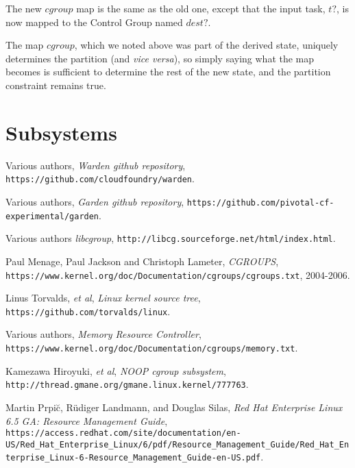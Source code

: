 \documentclass[a4paper,twoside,12pt]{article}
\begin{document}
The new $cgroup$ map is the same as the old one, except that the input task, $t?$, is now mapped to the Control Group named $dest?$.

The map $cgroup$, which we noted above was part of the derived state, uniquely determines the partition (and \emph{vice versa}), so simply saying what the map becomes is sufficient to determine the rest of the new state, and the partition constraint remains true.

\section{Subsystems}

\clearpage
\begin{flushleft}
\begin{thebibliography}{99}   %


  Various authors,
  \emph{Warden github repository},
  \texttt{https://github.com/cloudfoundry/warden}.

  Various authors,
  \emph{Garden github repository}, 
  \texttt{https://github.com/pivotal-cf-experimental/garden}.

  Various authors
  \emph{libcgroup},
  \texttt{http://libcg.sourceforge.net/html/index.html}.

  Paul Menage, Paul Jackson and Christoph Lameter,
  \emph{CGROUPS},
  \texttt{https://www.kernel.org/doc/Documentation/cgroups/cgroups.txt}, 2004-2006.

  Linus Torvalds, \emph{et al},
  \emph{Linux kernel source tree},
  \texttt{https://github.com/torvalds/linux}.

  Various authors,
  \emph{Memory Resource Controller},
  \texttt{https://www.kernel.org/doc/Documentation/cgroups/memory.txt}.

  Kamezawa Hiroyuki, \emph{et al},
  \emph{NOOP cgroup subsystem},
  \texttt{http://thread.gmane.org/gmane.linux.kernel/777763}.

  Martin Prpi\u{c}, R\"udiger Landmann, and Douglas Silas,
  \emph{Red Hat Enterprise Linux 6.5 GA: Resource Management Guide}, 
  \texttt{https://access.redhat.com/site/documentation/en-US\slash{}Red\_Hat\_Enterprise\_Linux/6/pdf/Resource\_Management\_Guide\slash{}Red\_Hat\_Enterprise\_Linux-6-Resource\_Management\_Guide-en-US.pdf}.

\end{thebibliography}
\end{flushleft}
\end{document}
